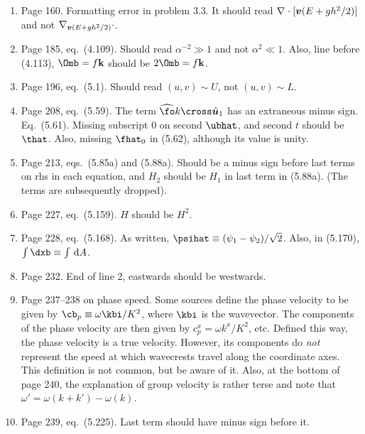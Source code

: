 \documentclass[10pt]{article}
\newcommand{\eq}{eq.\ } \newcommand{\Eq}{Eq.\ }
\begin{document}
\begin{enumerate}
\item Page 160. Formatting error in problem 3.3. It should read $\div[][\vb(E + gh^2/2)]$ and not $\div[\vb(E + gh^2/2)]$. 

\item Page 185, \eq (4.109). Should read $\alpha^{-2} \gg 1$ and not $\alpha^2 \ll 1$. Also, line before (4.113), $\Omb = f \kb$ should be $2\Omb = f \kb$.

\item Page 196, \eq (5.1). Should read $(u, v) \sim U$, not $(u,v) \sim L$.

\item Page 208, \eq (5.59). The term $\what \fo k\cross\hat{\ub}_1$ has an extraneous minus sign. \\
\Eq (5.61). Missing subscript 0 on second $\ubhat$, and second $t$ should be $\that$. Also, missing $\fhat_0$ in (5.62), although its value is unity.

\item Page 213, eqs.\ (5.85a) and (5.88a). Should be a minus sign before last terms on rhs in each equation, and $H_2$ should be $H_1$ in last term in (5.88a). (The terms are subsequently dropped).  

\item Page 227, \eq (5.159). $H$ should be $H^2$.

\item Page 228, \eq (5.168). As written, $\psihat \equiv (\psi_1 -\psi_2)/\sqrt 2$. Also, in (5.170), $\int \dxb \equiv \int \dA$. 

\item Page 232. End of line 2, eastwards should be westwards.

\item Page 237--238 on phase speed. Some sources define the phase
velocity to be given by $\cb_p \equiv \omega \kbi / K^2$, where $\kbi$
is the wavevector. The components of the phase velocity are then given
by $c^x_p = \omega k^x/K^2$, etc. Defined this way, the phase velocity
is a true velocity. However, its components do \emph{not} represent the
speed at which wavecrests travel along the coordinate axes. This
definition is not common, but be aware of it. Also, at the bottom of
page 240, the explanation of group velocity is rather terse and note
that ${\omega'} = \omega(k+k') - \omega(k)$.

\item Page 239, \eq (5.225). Last term should have minus sign before it.



\end{enumerate}
\end{document}
